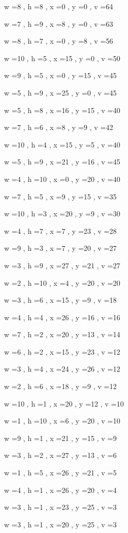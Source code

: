 \documentclass[11pt]{article}
\begin{document}
w =8 , h =8 , x =0 , y =0 , v =64
\par
w =7 , h =9 , x =8 , y =0 , v =63
\par
w =8 , h =7 , x =0 , y =8 , v =56
\par
w =10 , h =5 , x =15 , y =0 , v =50
\par
w =9 , h =5 , x =0 , y =15 , v =45
\par
w =5 , h =9 , x =25 , y =0 , v =45
\par
w =5 , h =8 , x =16 , y =15 , v =40
\par
w =7 , h =6 , x =8 , y =9 , v =42
\par
w =10 , h =4 , x =15 , y =5 , v =40
\par
w =5 , h =9 , x =21 , y =16 , v =45
\par
w =4 , h =10 , x =0 , y =20 , v =40
\par
w =7 , h =5 , x =9 , y =15 , v =35
\par
w =10 , h =3 , x =20 , y =9 , v =30
\par
w =4 , h =7 , x =7 , y =23 , v =28
\par
w =9 , h =3 , x =7 , y =20 , v =27
\par
w =3 , h =9 , x =27 , y =21 , v =27
\par
w =2 , h =10 , x =4 , y =20 , v =20
\par
w =3 , h =6 , x =15 , y =9 , v =18
\par
w =4 , h =4 , x =26 , y =16 , v =16
\par
w =7 , h =2 , x =20 , y =13 , v =14
\par
w =6 , h =2 , x =15 , y =23 , v =12
\par
w =3 , h =4 , x =24 , y =26 , v =12
\par
w =2 , h =6 , x =18 , y =9 , v =12
\par
w =10 , h =1 , x =20 , y =12 , v =10
\par
w =1 , h =10 , x =6 , y =20 , v =10
\par
w =9 , h =1 , x =21 , y =15 , v =9
\par
w =3 , h =2 , x =27 , y =13 , v =6
\par
w =1 , h =5 , x =26 , y =21 , v =5
\par
w =4 , h =1 , x =26 , y =20 , v =4
\par
w =3 , h =1 , x =23 , y =25 , v =3
\par
w =3 , h =1 , x =20 , y =25 , v =3
\par
\newpage


\end{document}
